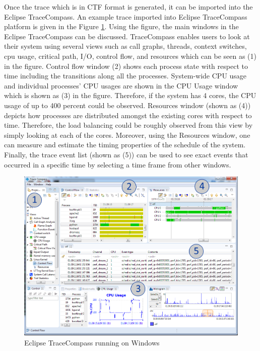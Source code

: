 \begin{itemize}
	Once the trace which is in CTF format is generated, it can be imported into the Eclipse TraceCompass. An example trace imported into Eclipse TraceCompass platform is given in the Figure \ref{fig:tracecompass}. Using the figure, the main windows in the Eclipse TraceCompass can be discussed. TraceCompass enables users to look at their system using several views such as call graphs, threads, context switches, cpu usage, critical path, I/O, control flow, and resources which can be seen as (1) in the figure. Control flow window (2) shows each process state with respect to time including the transitions along all the processes. System-wide CPU usage and individual processes' CPU usages are shown in the CPU Usage window which is shown as (3) in the figure. Therefore, if the system has 4 cores, the CPU usage of up to 400 percent could be observed. Resources window (shown as (4)) depicts how processes are distributed amongst the existing cores with respect to time. Therefore, the load balancing could be roughly observed from this view by simply looking at each of the cores. Moreover, using the Resources window, one can measure and estimate the timing properties of the schedule of the system. Finally, the trace event list (shown as (5)) can be used to see exact events that occurred in a specific time by selecting a time frame from other windows.
	\begin{figure}[!ht]
		\centering
		\captionsetup{justification=centering}
		\includegraphics[scale=0.45]{content/images/tracecompass.png}
		\caption{Eclipse TraceCompass running on Windows}
		\label{fig:tracecompass}
	\end{figure}


\end{itemize}
